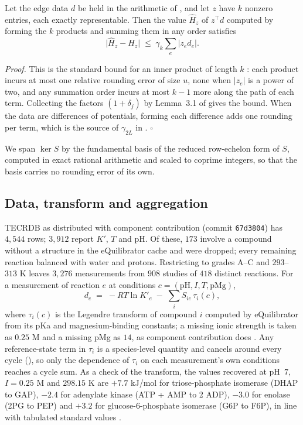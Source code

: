\documentclass[11pt,a4paper]{article}
\theoremstyle{definition}
\theoremstyle{remark}
\newcommand{\abs}[1]{\lvert#1\rvert}
\newcommand{\hol}{H}
\newcommand{\mach}{u}
\begin{document}
\begin{proposition}
\label{prop:edge-floor}
Let the edge data $d$ be held in the arithmetic of , and
let $z$ have $k$ nonzero entries, each exactly representable. Then the
value $\widehat{\hol}_z$ of $z^{\top}d$ computed by forming the $k$
products and summing them in any order satisfies
\[
  \bigl\lvert\widehat{\hol}_z-\hol_z\bigr\rvert
  \;\le\;\gamma_k\sum_{e}\abs{z_e d_e}.
\]
\end{proposition}

\noindent\emph{Proof.} This is the standard bound for an inner product
of length $k$ \citep[Section~3.1]{higham2002}: each product incurs at
most one relative rounding error of size $\mach$, none when $\abs{z_e}$
is a power of two, and any summation order incurs at most $k-1$ more
along the path of each term. Collecting the factors $(1+\delta_j)$ by
Lemma~3.1 of \citet{higham2002} gives the bound. When the data are
differences of potentials, forming each difference adds one rounding
per term, which is the source of $\gamma_{2L}$ in
. \hfill$\square$

We span $\ker S$ by the fundamental basis of the reduced row-echelon
form of $S$, computed in exact rational arithmetic and scaled to coprime
integers, so that the basis carries no rounding error of its own.

\subsection*{Data, transform and aggregation}

TECRDB as distributed with component contribution (commit
\texttt{67d3804}) has $4{,}544$ rows; $3{,}912$ report $K'$, $T$ and
pH. Of these, $173$ involve a compound without a structure in the
eQuilibrator cache and were dropped; every remaining reaction balanced
with water and protons. Restricting to grades A--C and $293$--$313$ K
leaves $3{,}276$ measurements from $908$ studies of $418$ distinct
reactions. For a measurement of reaction $e$ at conditions
$c=(\mathrm{pH},I,T,\mathrm{pMg})$,
\[
  d_e \;=\; -RT\ln K'_e \;-\; \sum_i S_{ie}\,\tau_i(c),
\]
where $\tau_i(c)$ is the Legendre transform of compound $i$ computed by
eQuilibrator \citep{beber2022} from its pKa and magnesium-binding
constants; a missing ionic strength is taken as $0.25$ M and a missing
pMg as $14$, as component contribution does \citep{noor2013}. Any
reference-state term in $\tau_i$ is a species-level quantity and
cancels around every cycle (), so only the
dependence of $\tau_i$ on each measurement's own conditions reaches a
cycle sum. As a check of the transform, the values recovered at pH~$7$,
$I=0.25$ M and $298.15$ K are $+7.7$ kJ/mol for triose-phosphate
isomerase (DHAP to GAP), $-2.4$ for adenylate kinase (ATP + AMP to 2
ADP), $-3.0$ for enolase (2PG to PEP) and $+3.2$ for glucose-6-phosphate
isomerase (G6P to F6P), in line with tabulated standard values
\citep{alberty1998}.
\end{document}
